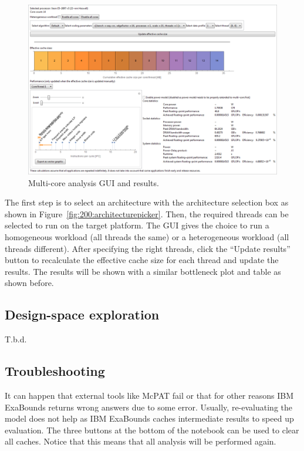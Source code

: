 \begin{figure}
  \centering
  \includegraphics[width=1.0\columnwidth]{img/multicoregui.png}
  \caption{Multi-core analysis GUI and results.}
  \label{fig:200:multicore}
\end{figure}

The first step is to select an architecture with the architecture selection box as shown in Figure~\ref{fig:200:architecturepicker}. Then, the required threads can be selected to run on the target platform. The GUI gives the choice to run a homogeneous workload (all threads the same) or a heterogeneous workload (all threads different). After specifying the right threads, click the ``Update results'' button to recalculate the effective cache size for each thread and update the results. The results will be shown with a similar bottleneck plot and table as shown before.

\subsection{Design-space exploration}

T.b.d.

\subsection{Troubleshooting}

It can happen that external tools like McPAT fail or that for other reasons IBM ExaBounds returns wrong answers due to some error. Usually, re-evaluating the model does not help as IBM ExaBounds caches intermediate results to speed up evaluation. The three buttons at the bottom of the notebook can be used to clear all caches. Notice that this means that all analysis will be performed again.
